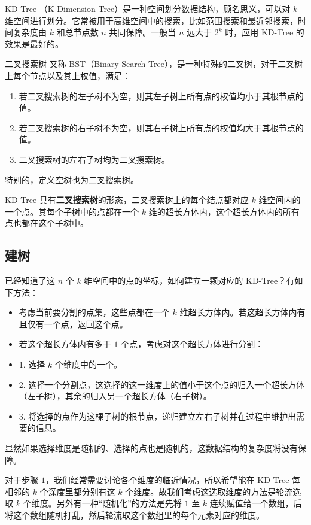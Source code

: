
KD-Tree （K-Dimension Tree）是一种空间划分数据结构，顾名思义，可以对 $k$ 维空间进行划分。它常被用于高维空间中的搜索，比如范围搜索和最近邻搜索，时间复杂度由 $k$ 和总节点数 $n$ 共同保障。一般当 $n$ 远大于 $2^k$ 时，应用 KD-Tree 的效果是最好的。

\begin{definition}{二叉搜索树}
又称 BST（Binary Search Tree），是一种特殊的二叉树，对于二叉树上每个节点以及其上权值，满足：
\begin{enumerate}
\item 若二叉搜索树的左子树不为空，则其左子树上所有点的权值均小于其根节点的值。
\item 若二叉搜索树的右子树不为空，则其右子树上所有点的权值均大于其根节点的值。
\item 二叉搜索树的左右子树均为二叉搜索树。
\end{enumerate}
特别的，定义空树也为二叉搜索树。
\end{definition}

KD-Tree 具有\textbf{二叉搜索树}的形态，二叉搜索树上的每个结点都对应 $k$ 维空间内的一个点。其每个子树中的点都在一个 $k$ 维的超长方体内，这个超长方体内的所有点也都在这个子树中。

\subsection{建树}

已经知道了这 $n$ 个 $k$ 维空间中的点的坐标，如何建立一颗对应的 KD-Tree？有如下方法：

\begin{itemize}
\item 考虑当前要分割的点集，这些点都在一个 $k$ 维超长方体内。若这超长方体内有且仅有一个点，返回这个点。
\item 若这个超长方体内有多于 $1$ 个点，考虑对这个超长方体进行分割：
\item 1. 选择 $k$ 个维度中的一个。
    \item 2. 选择一个分割点，这选择的这一维度上的值小于这个点的归入一个超长方体（左子树），其余的归入另一个超长方体（右子树）。
    \item 3. 将选择的点作为这棵子树的根节点，递归建立左右子树并在过程中维护出需要的信息。
\end{itemize}

显然如果选择维度是随机的、选择的点也是随机的，这数据结构的复杂度将没有保障。

对于步骤 $1$，我们经常需要讨论各个维度的临近情况，所以希望能在 KD-Tree 每相邻的 $k$ 个深度里都分别有这 $k$ 个维度。故我们考虑这选取维度的方法是轮流选取 $k$ 个维度。另外有一种“随机化”的方法是先将 $1$ 至 $k$ 连续赋值给一个数组，后将这个数组随机打乱，然后轮流取这个数组里的每个元素对应的维度。

